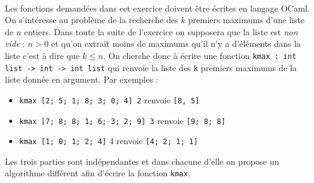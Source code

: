 \documentclass[11pt,a4paper]{article}
\begin{document}
\begin{Exercise}[title = {Recherche des $k$ premiers maximums d'une liste}] \\
	Les fonctions demandées dans cet exercice doivent être écrites en langage OCaml.\smallskip \\
	On s'intéresse au problème de la recherche des $k$ premiers maximums d'une liste de $n$ entiers. Dans toute la suite de l'exercice on supposera que la liste est \textit{non vide} : $n>0$ et qu'on extrait moins de maximums qu'il n'y a d'éléments dans la liste c'est à dire que $k \leqslant n$. On cherche donc à écrire une fonction {\tt kmax : int list -> int -> int list}  qui renvoie la liste des {\tt k} premiers maximums de la liste donnée en argument. Par exemples :
	\begin{itemize}
		\item {\tt kmax [2; 5; 1; 8; 3; 0; 4] 2} renvoie {\tt [8, 5]}
		\item {\tt kmax [7; 8; 8; 1; 6; 3; 2; 9] 3} renvoie {\tt [9; 8; 8]}
		\item {\tt kmax [1; 0; 1; 2; 4]} 4 renvoie {\tt [4; 2; 1; 1]}
	\end{itemize}
	Les trois parties sont indépendantes et dans chacune d'elle on propose un algorithme différent afin d'écrire la fonction {\tt kmax}.\medskip


\end{Exercise}
\end{document}
